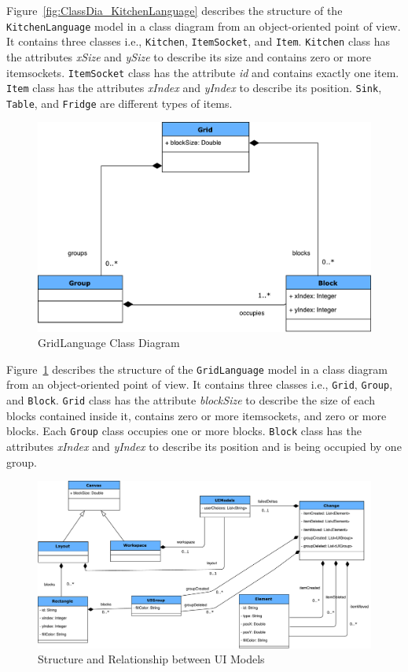 Figure~\ref{fig:ClassDia_KitchenLanguage} describes the structure of the \texttt{KitchenLanguage} model in a class diagram from an object-oriented point of view. It contains three classes i.e., \texttt{Kitchen}, \texttt{ItemSocket}, and \texttt{Item}. \texttt{Kitchen} class has the attributes \textit{xSize} and \textit{ySize} to describe its size and contains zero or more itemsockets. \texttt{ItemSocket} class has the attribute \textit{id} and contains exactly one item. \texttt{Item} class has the attributes \textit{xIndex} and \textit{yIndex} to describe its position. \texttt{Sink}, \texttt{Table}, and \texttt{Fridge} are different types of items.

\begin{figure}
	\includegraphics[width=1\textwidth]{figures/ClassDia_GridLanguage}
	\caption{GridLanguage Class Diagram }
	\label{fig:ClassDia_GridLanguage}
\end{figure}

Figure~\ref{fig:ClassDia_GridLanguage} describes the structure of the \texttt{GridLanguage} model in a class diagram from an object-oriented point of view. It contains three classes i.e., \texttt{Grid}, \texttt{Group}, and \texttt{Block}. \texttt{Grid} class has the attribute \textit{blockSize} to describe the size of each blocks contained inside it, contains zero or more itemsockets, and zero or more blocks. Each \texttt{Group} class occupies one or more blocks. \texttt{Block} class has the attributes \textit{xIndex} and \textit{yIndex} to describe its position and is being occupied by one group.

\begin{figure}
	\includegraphics[width=1\textwidth]{figures/ClassDia_UI-Models}
	\caption{Structure and Relationship between UI Models}
	\label{fig:ClassDia_UI-Models}
\end{figure}

